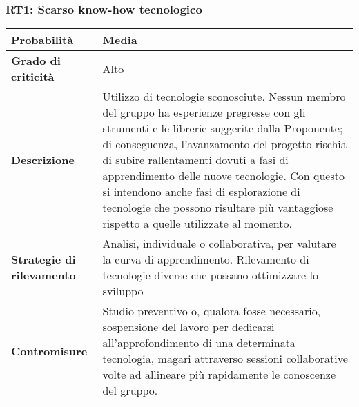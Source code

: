 \noindent\begin{minipage}{\textwidth}
\subsubsection{RT1: Scarso know-how tecnologico}

\bgroup
\begin{adjustwidth}{-0.5cm}{-0.5cm}
 	\begin{longtable}{P{4.5cm}|>{\justifying \arraybackslash}P{9cm}}

		\textbf{Probabilità} & Media \\
        \hline
        \textbf{Grado di criticità} & Alto \\
        \hline
        \textbf{Descrizione} & Utilizzo di tecnologie sconosciute. Nessun membro del gruppo ha
        esperienze pregresse con gli strumenti e le librerie suggerite dalla Proponente; di conseguenza, l’avanzamento del progetto rischia di subire rallentamenti dovuti a fasi di apprendimento delle nuove tecnologie.
        Con questo si intendono anche fasi di esplorazione di tecnologie che possono risultare più vantaggiose rispetto a quelle utilizzate al momento. \\
        \hline
        \textbf{Strategie di rilevamento} &  Analisi, individuale o collaborativa, per valutare la
        curva di apprendimento. Rilevamento di tecnologie diverse che possano ottimizzare lo sviluppo \\
        \hline
        \textbf{Contromisure} & Studio preventivo o, qualora fosse necessario, sospensione del
        lavoro per dedicarsi all’approfondimento di una determinata tecnologia, magari attraverso sessioni collaborative volte ad allineare più rapidamente le conoscenze del gruppo.  
	\end{longtable}
\end{adjustwidth}
\egroup
\end{minipage}